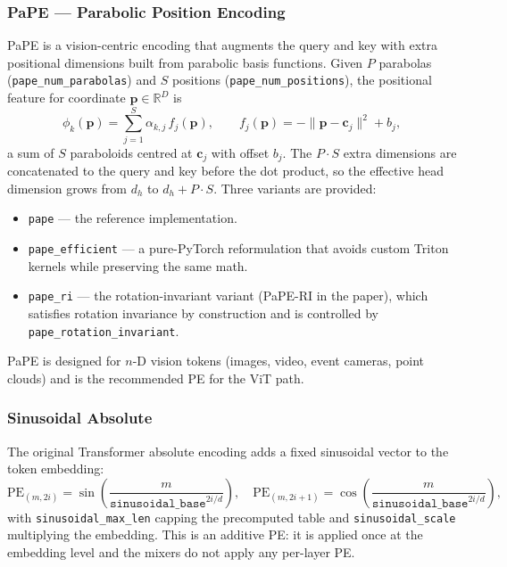 \subsubsection{PaPE --- Parabolic Position Encoding}

PaPE \citep{ohrstrom_pape_2026} is a vision-centric encoding that
augments the query and key with extra positional dimensions built from
parabolic basis functions. Given $P$ parabolas
(\texttt{pape\_num\_parabolas}) and $S$ positions
(\texttt{pape\_num\_positions}), the positional feature for coordinate
$\mathbf{p} \in \mathbb{R}^D$ is
\[
\phi_k(\mathbf{p}) = \sum_{j=1}^{S} \alpha_{k,j}\, f_j(\mathbf{p}), \qquad
f_j(\mathbf{p}) = -\|\mathbf{p} - \mathbf{c}_j\|^2 + b_j,
\]
a sum of $S$ paraboloids centred at $\mathbf{c}_j$ with offset $b_j$.
The $P \cdot S$ extra dimensions are concatenated to the query and key
before the dot product, so the effective head dimension grows from
$d_h$ to $d_h + P \cdot S$. Three variants are provided:

\begin{itemize}
\item \texttt{pape} --- the reference implementation.
\item \texttt{pape\_efficient} --- a pure-PyTorch reformulation that
   avoids custom Triton kernels while preserving the same math.
\item \texttt{pape\_ri} --- the rotation-invariant variant
   (PaPE-RI in the paper), which satisfies rotation invariance by
   construction and is controlled by \texttt{pape\_rotation\_invariant}.
\end{itemize}

PaPE is designed for $n$-D vision tokens (images, video, event cameras,
point clouds) and is the recommended PE for the ViT path.

\subsubsection{Sinusoidal Absolute}

The original Transformer absolute encoding \citep{vaswani_attention_2017}
adds a fixed sinusoidal vector to the token embedding:
\[
\text{PE}_{(m,2i)} = \sin\!\left(\frac{m}{\texttt{sinusoidal\_base}^{2i/d}}\right), \quad
\text{PE}_{(m,2i+1)} = \cos\!\left(\frac{m}{\texttt{sinusoidal\_base}^{2i/d}}\right),
\]
with \texttt{sinusoidal\_max\_len} capping the precomputed table and
\texttt{sinusoidal\_scale} multiplying the embedding. This is an
additive PE: it is applied once at the embedding level and the mixers
do not apply any per-layer PE.

